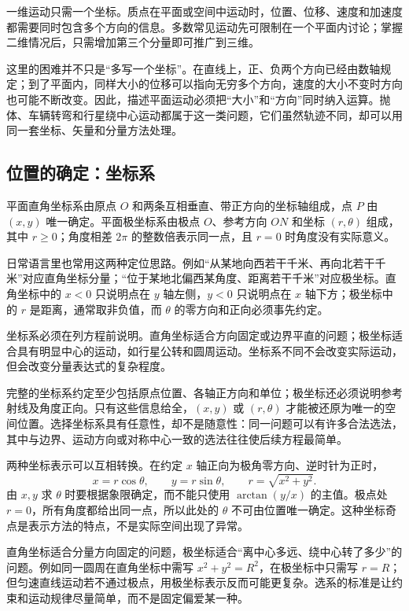 {一维运动只需一个坐标。质点在平面或空间中运动时，位置、位移、速度和加速度都需要同时包含多个方向的信息。多数常见运动先可限制在一个平面内讨论；掌握二维情况后，只需增加第三个分量即可推广到三维。

这里的困难并不只是“多写一个坐标”。在直线上，正、负两个方向已经由数轴规定；到了平面内，同样大小的位移可以指向无穷多个方向，速度的大小不变时方向也可能不断改变。因此，描述平面运动必须把“大小”和“方向”同时纳入运算。抛体、车辆转弯和行星绕中心运动都属于这一类问题，它们虽然轨迹不同，却可以用同一套坐标、矢量和分量方法处理。

\subsection{位置的确定：坐标系}

平面直角坐标系由原点 $O$ 和两条互相垂直、带正方向的坐标轴组成，点 $P$ 由 $(x,y)$ 唯一确定。平面极坐标系由极点 $O$、参考方向 $ON$ 和坐标 $(r,\theta)$ 组成，其中 $r\ge0$；角度相差 $2\pi$ 的整数倍表示同一点，且 $r=0$ 时角度没有实际意义。

日常语言里也常用这两种定位思路。例如“从某地向西若干千米、再向北若干千米”对应直角坐标分量；“位于某地北偏西某角度、距离若干千米”对应极坐标。直角坐标中的 $x<0$ 只说明点在 $y$ 轴左侧，$y<0$ 只说明点在 $x$ 轴下方；极坐标中的 $r$ 是距离，通常取非负值，而 $\theta$ 的零方向和正向必须事先约定。

\CoordinateSystemsDiagram

坐标系必须在列方程前说明。直角坐标适合方向固定或边界平直的问题；极坐标适合具有明显中心的运动，如行星公转和圆周运动。坐标系不同不会改变实际运动，但会改变分量表达式的复杂程度。

完整的坐标系约定至少包括原点位置、各轴正方向和单位；极坐标还必须说明参考射线及角度正向。只有这些信息给全，$(x,y)$ 或 $(r,\theta)$ 才能被还原为唯一的空间位置。选择坐标系具有任意性，却不是随意性：同一问题可以有许多合法选法，其中与边界、运动方向或对称中心一致的选法往往使后续方程最简单。

两种坐标表示可以互相转换。在约定 $x$ 轴正向为极角零方向、逆时针为正时，
\begin{equation}
 x=r\cos\theta,\qquad y=r\sin\theta,\qquad
 r=\sqrt{x^2+y^2}.
\end{equation}
由 $x,y$ 求 $\theta$ 时要根据象限确定，而不能只使用 $\arctan(y/x)$ 的主值。极点处 $r=0$，所有角度都给出同一点，所以此处的 $\theta$ 不可由位置唯一确定。这种坐标奇点是表示方法的特点，不是实际空间出现了异常。

直角坐标适合分量方向固定的问题，极坐标适合“离中心多远、绕中心转了多少”的问题。例如同一圆周在直角坐标中需写 $x^2+y^2=R^2$，在极坐标中只需写 $r=R$；但匀速直线运动若不通过极点，用极坐标表示反而可能更复杂。选系的标准是让约束和运动规律尽量简单，而不是固定偏爱某一种。

}
